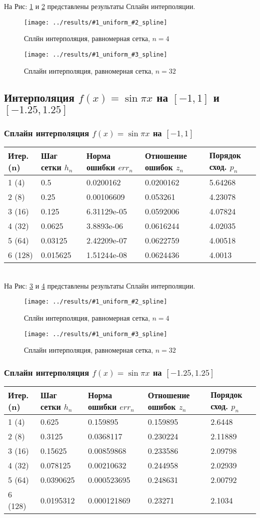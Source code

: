 \documentclass[12pt]{article}
\newcommand{\spline}[3] {
	На Рис:  \ref{fig:#1uniform#2spline} и \ref{fig:#1uniform#3spline} представлены результаты Сплайн интерполяции.
	
	\begin{figure}[H]
		\centering
		\texttt{[image: ../results/\#1\_uniform\_\#2\_spline]}
		\caption{Сплйн интерполяция, равномерная сетка, $n = #2$}
		\label{fig:#1uniform#2spline}
	\end{figure}
	\begin{figure}[H]
		\centering
		\texttt{[image: ../results/\#1\_uniform\_\#3\_spline]}
		\caption{Сплайн интерполяция, равномерная сетка, $n = #3$}
		\label{fig:#1uniform#3spline}
	\end{figure}
}
\begin{document}
\spline{quad}{4}{32}

\subsection{Интерполяция $f(x) = \sin{\pi x}$ на $[-1, 1]$ и $[-1.25, 1.25]$}
\subsubsection{Сплайн интерполяция $f(x) = \sin{\pi x}$ на $[-1, 1]$}
\begin{tabular}{|l|l|l|l|l|}
	\hline 
	Итер.(n) & Шаг сетки $h_n$ & Норма ошибки $err_n$ &  Отношение ошибок $z_n$ & Порядок сход. $p_n$ \\ \hline
	1 (4)  & 0.5 & 0.0200162 & 0.0200162 & 5.64268 \\ \hline
	2 (8)  & 0.25 & 0.00106609 & 0.053261 & 4.23078 \\ \hline
	3 (16)  & 0.125 & 6.31129e-05 & 0.0592006 & 4.07824 \\ \hline
	4 (32)  & 0.0625 & 3.8893e-06 & 0.0616244 & 4.02035 \\ \hline
	5 (64)  & 0.03125 & 2.42209e-07 & 0.0622759 & 4.00518 \\ \hline
	6 (128)  & 0.015625 & 1.51244e-08 & 0.0624436 & 4.0013 \\ \hline
\end{tabular}\\

\spline{sin1}{4}{32}

\subsubsection{Сплайн интерполяция $f(x) = \sin{\pi x}$ на $[-1.25, 1.25]$}
\begin{tabular}{|l|l|l|l|l|}
	\hline 
	Итер.(n) & Шаг сетки $h_n$ & Норма ошибки $err_n$ &  Отношение ошибок $z_n$ & Порядок сход. $p_n$ \\ \hline
	1 (4)  & 0.625 & 0.159895 & 0.159895 & 2.6448 \\ \hline
	2 (8)  & 0.3125 & 0.0368117 & 0.230224 & 2.11889 \\ \hline
	3 (16)  & 0.15625 & 0.00859868 & 0.233586 & 2.09798 \\ \hline
	4 (32)  & 0.078125 & 0.00210632 & 0.244958 & 2.02939 \\ \hline
	5 (64)  & 0.0390625 & 0.000523695 & 0.248631 & 2.00792 \\ \hline
	6 (128)  & 0.0195312 & 0.000121869 & 0.23271 & 2.1034 \\ \hline
\end{tabular}\\
\end{document}
